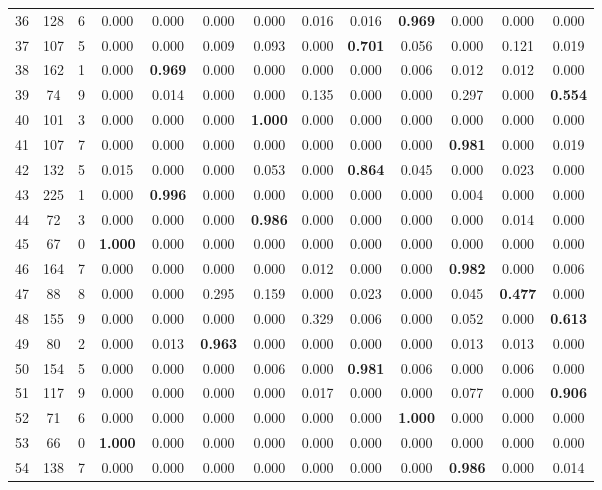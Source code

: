 \documentclass[a4paper,fleqn,usenatbib]{mnras}
\begin{document}
\begin{table*}
\begin{tabular}{|c|c|c|c|c|c|c|c|c|c|c|c|c|}
36 & 128 & 6 & 0.000 & 0.000 & 0.000 & 0.000 & 0.016 & 0.016 & \textbf{0.969} & 0.000 & 0.000 & 0.000\\
37 & 107 & 5 & 0.000 & 0.000 & 0.009 & 0.093 & 0.000 & \textbf{0.701} & 0.056 & 0.000 & 0.121 & 0.019\\
38 & 162 & 1 & 0.000 & \textbf{0.969} & 0.000 & 0.000 & 0.000 & 0.000 & 0.006 & 0.012 & 0.012 & 0.000\\
39 & 74 & 9 & 0.000 & 0.014 & 0.000 & 0.000 & 0.135 & 0.000 & 0.000 & 0.297 & 0.000 & \textbf{0.554}\\
40 & 101 & 3 & 0.000 & 0.000 & 0.000 & \textbf{1.000} & 0.000 & 0.000 & 0.000 & 0.000 & 0.000 & 0.000\\
41 & 107 & 7 & 0.000 & 0.000 & 0.000 & 0.000 & 0.000 & 0.000 & 0.000 & \textbf{0.981} & 0.000 & 0.019\\
42 & 132 & 5 & 0.015 & 0.000 & 0.000 & 0.053 & 0.000 & \textbf{0.864} & 0.045 & 0.000 & 0.023 & 0.000\\
43 & 225 & 1 & 0.000 & \textbf{0.996} & 0.000 & 0.000 & 0.000 & 0.000 & 0.000 & 0.004 & 0.000 & 0.000\\
44 & 72 & 3 & 0.000 & 0.000 & 0.000 & \textbf{0.986} & 0.000 & 0.000 & 0.000 & 0.000 & 0.014 & 0.000\\
45 & 67 & 0 & \textbf{1.000} & 0.000 & 0.000 & 0.000 & 0.000 & 0.000 & 0.000 & 0.000 & 0.000 & 0.000\\
46 & 164 & 7 & 0.000 & 0.000 & 0.000 & 0.000 & 0.012 & 0.000 & 0.000 & \textbf{0.982} & 0.000 & 0.006\\
47 & 88 & 8 & 0.000 & 0.000 & 0.295 & 0.159 & 0.000 & 0.023 & 0.000 & 0.045 & \textbf{0.477} & 0.000\\
48 & 155 & 9 & 0.000 & 0.000 & 0.000 & 0.000 & 0.329 & 0.006 & 0.000 & 0.052 & 0.000 & \textbf{0.613}\\
49 & 80 & 2 & 0.000 & 0.013 & \textbf{0.963} & 0.000 & 0.000 & 0.000 & 0.000 & 0.013 & 0.013 & 0.000\\
50 & 154 & 5 & 0.000 & 0.000 & 0.000 & 0.006 & 0.000 & \textbf{0.981} & 0.006 & 0.000 & 0.006 & 0.000\\
51 & 117 & 9 & 0.000 & 0.000 & 0.000 & 0.000 & 0.017 & 0.000 & 0.000 & 0.077 & 0.000 & \textbf{0.906}\\
52 & 71 & 6 & 0.000 & 0.000 & 0.000 & 0.000 & 0.000 & 0.000 & \textbf{1.000} & 0.000 & 0.000 & 0.000\\
53 & 66 & 0 & \textbf{1.000} & 0.000 & 0.000 & 0.000 & 0.000 & 0.000 & 0.000 & 0.000 & 0.000 & 0.000\\
54 & 138 & 7 & 0.000 & 0.000 & 0.000 & 0.000 & 0.000 & 0.000 & 0.000 & \textbf{0.986} & 0.000 & 0.014\\

\end{tabular}
\end{table*}
\end{document}
